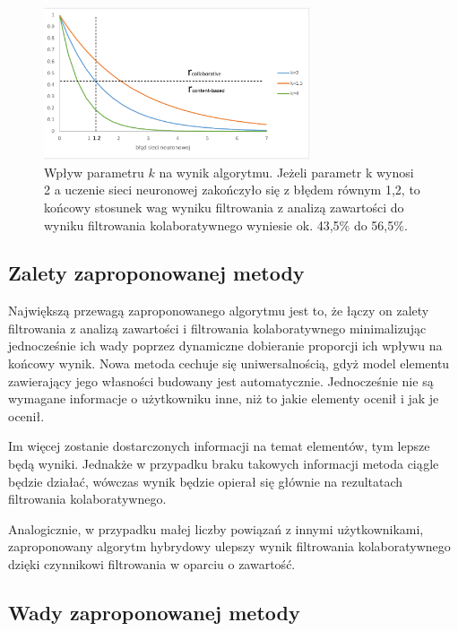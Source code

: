 \documentclass[twoside]{iisthesis}
\begin{document}
		 \begin{figure}[!ht] 
		 	\centering
		 	\includegraphics[width=0.7\textwidth]{hybridfunction}
		 	\caption{Wpływ parametru $k$ na wynik algorytmu. Jeżeli parametr k wynosi 2 a uczenie sieci neuronowej zakończyło się z błędem równym 1,2, to końcowy stosunek wag wyniku filtrowania z analizą zawartości do wyniku filtrowania kolaboratywnego wyniesie ok. 43,5\% do 56,5\%.}
		 	\label{fig:hybridfunction}
		 \end{figure}
	 
		 \subsection{Zalety zaproponowanej metody}
		 
		 Największą przewagą zaproponowanego algorytmu jest to, że łączy on zalety filtrowania z analizą zawartości i filtrowania kolaboratywnego minimalizując jednocześnie ich wady poprzez dynamiczne dobieranie proporcji ich wpływu na końcowy wynik. Nowa metoda cechuje się uniwersalnością, gdyż model elementu zawierający jego własności budowany jest automatycznie. Jednocześnie nie są wymagane informacje o użytkowniku inne, niż to jakie elementy ocenił i jak je ocenił. 
		 
		 Im więcej zostanie dostarczonych informacji na temat elementów, tym lepsze będą wyniki. Jednakże w przypadku braku takowych informacji metoda ciągle będzie działać,  wówczas wynik będzie opierał się głównie na rezultatach filtrowania kolaboratywnego.
		 
		 Analogicznie, w przypadku małej liczby powiązań z innymi użytkownikami, zaproponowany algorytm hybrydowy ulepszy wynik filtrowania kolaboratywnego dzięki czynnikowi filtrowania w oparciu o zawartość. 
		 
		 \subsection{Wady zaproponowanej metody}
		 
\end{document}
